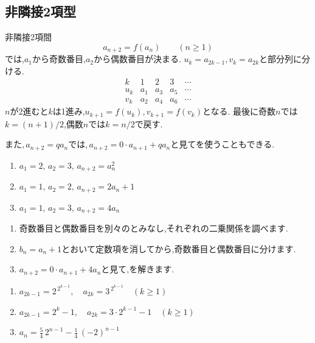\subsection{非隣接2項型}\label{節：非隣接2項間漸化式型}

  非隣接2項間
  \[
    a_{n+2}=f(a_n)\qquad(n\ge1)
  \]
  では,$a_1$から奇数番目,$a_2$から偶数番目が決まる.
  $u_k=a_{2k-1},v_k=a_{2k}$と部分列に分ける.
  \[
    \begin{array}{c|cccc}
      k&1&2&3&\cdots\\ \hline
      u_k&a_1&a_3&a_5&\cdots\\
      v_k&a_2&a_4&a_6&\cdots
    \end{array}
  \]
  $n$が2進むと$k$は1進み,$u_{k+1}=f(u_k),v_{k+1}=f(v_k)$となる.
  最後に奇数$n$では$k=(n+1)/2$,偶数$n$では$k=n/2$で戻す.

  また,\,$a_{n+2}=qa_n$では,\,$a_{n+2}=0\cdot a_{n+1}+qa_n$と見てを使うこともできる.

  \noindent {}\par\nobreak
  \begin{enumerate}[label=(\arabic*),parsep=3pt,format=\bookitemlink{example-nonadjacent-1}{problem}{answer}]
    \item $\displaystyle a_1=2,\,a_2=3,\,a_{n+2}=a_n^2$
    \item $\displaystyle a_1=1,\,a_2=2,\,a_{n+2}=2a_n+1$
    \item $\displaystyle a_1=1,\,a_2=3,\,a_{n+2}=4a_n$
  \end{enumerate}

  \noindent{}\par\nobreak
  \begin{enumerate}[label=(\arabic*),parsep=3pt,format=\bookitemlink{example-nonadjacent-1}{hint}{problem}]
    \item 奇数番目と偶数番目を別々のとみなし,それぞれの二乗関係を調べます.
    \item $b_n=a_n+1$とおいて定数項を消してから,奇数番目と偶数番目に分けます.
    \item $a_{n+2}=0\cdot a_{n+1}+4a_n$と見て,を解きます.
  \end{enumerate}

  \noindent{}\par\nobreak
  \begin{enumerate}[label=(\arabic*),parsep=3pt,format=\bookitemlink{example-nonadjacent-1}{answer}{problem}]
    \item $\displaystyle a_{2k-1}=2^{\,2^{k-1}},\quad a_{2k}=3^{\,2^{k-1}}\quad(k\ge1)$
    \item $\displaystyle a_{2k-1}=2^k-1,\quad a_{2k}=3\cdot2^{k-1}-1\quad(k\ge1)$
    \item $\displaystyle a_n=\frac54\,2^{n-1}-\frac14\,(-2)^{n-1}$
  \end{enumerate}

